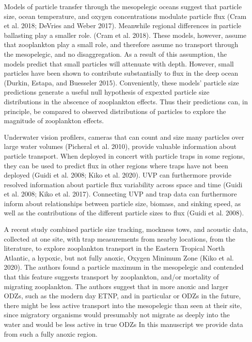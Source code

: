 \documentclass[]{article}
\begin{document}
Models of particle transfer through the mesopelegic oceans suggest that
particle size, ocean temperature, and oxygen concentrations modulate
particle flux (Cram et al. 2018; DeVries and Weber 2017). Meanwhile
regional differences in particle ballasting play a smaller role. (Cram
et al. 2018). These models, however, assume that zooplankton play a
small role, and therefore assume no transport through the mesopelegic,
and no disaggregation. As a result of this assumption, the models
predict that small particles will attenuate with depth. However, small
particles have been shown to contribute substantially to flux in the
deep ocean (Durkin, Estapa, and Buesseler 2015). Conveniently, these
models' particle size predictions generate a useful null hypothesis of
expexted particle size distributions in the abscence of zooplankton
effects. Thus their predictions can, in principle, be compared to
observed distributions of particles to explore the magnitude of
zooplankton effects.

Underwater vision profilers, cameras that can count and size many
particles over large water volumes (Picheral et al. 2010), provide
valuable information about particle transport. When deployed in concert
with particle traps in some regions, they can be used to predict flux in
other regions where traps have not been deployed (Guidi et al. 2008;
Kiko et al. 2020). UVP can furthermore provide resolved information
about particle flux variability across space and time (Guidi et al.
2008; Kiko et al. 2017). Connecting UVP and trap data can furthermore
inform about relationships between particle size, biomass, and sinking
speed, as well as the contributions of the different particle sizes to
flux (Guidi et al. 2008).

A recent study combined particle size tracking, mockness tows, and
acoustic data, collected at one site, with trap measurements from nearby
locations, from the literature, to explore zooplankton transport in the
Eastern Tropical North Atlantic, a hypoxic, but not fully anoxic, Oxygen
Minimum Zone (Kiko et al. 2020). The authors found a particle maximum in
the mesopelegic and contended that this feature suggests transport by
zooplankton, and/or mortality of migrating zooplankton. The authors
suggest that in more anoxic and larger ODZs, such as the modern day
ETNP, and in particular or ODZs in the future, there might be less
active transport into the mesopelegic than seen at their site, since
migratory organisms would presumably not migrate as deeply into the
water and would be less active in true ODZs In this manuscript we
provide data from such a fully anoxic region.
\end{document}
